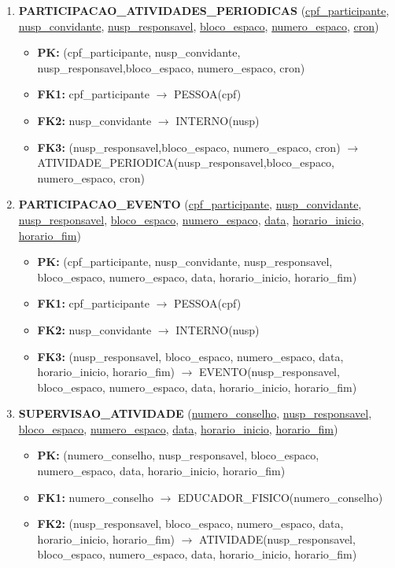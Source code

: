 \documentclass{article}
\begin{document}
\begin{enumerate}
    \item \textbf{PARTICIPACAO\_ATIVIDADES\_PERIODICAS} (\underline{cpf\_participante}, \underline{nusp\_convidante}, \underline{nusp\_responsavel}, \underline{bloco\_espaco}, \underline{numero\_espaco}, \underline{cron})
        \begin{itemize}
            \item \textbf{PK:} (cpf\_participante, nusp\_convidante, nusp\_responsavel,bloco\_espaco, numero\_espaco, cron)
            \item \textbf{FK1:} cpf\_participante $\rightarrow$ PESSOA(cpf)
            \item \textbf{FK2:} nusp\_convidante $\rightarrow$ INTERNO(nusp)
            \item \textbf{FK3:} (nusp\_responsavel,bloco\_espaco, numero\_espaco, cron) $\rightarrow$ ATIVIDADE\_PERIODICA(nusp\_responsavel,bloco\_espaco, numero\_espaco, cron)
        \end{itemize}

    \item \textbf{PARTICIPACAO\_EVENTO} (\underline{cpf\_participante}, \underline{nusp\_convidante}, \underline{nusp\_responsavel}, \underline{bloco\_espaco}, \underline{numero\_espaco}, \underline{data}, \underline{horario\_inicio}, \underline{horario\_fim})
        \begin{itemize}
            \item \textbf{PK:} (cpf\_participante, nusp\_convidante, nusp\_responsavel, bloco\_espaco, numero\_espaco, data, horario\_inicio, horario\_fim)
            \item \textbf{FK1:} cpf\_participante $\rightarrow$ PESSOA(cpf)
            \item \textbf{FK2:} nusp\_convidante $\rightarrow$ INTERNO(nusp)
            \item \textbf{FK3:} (nusp\_responsavel, bloco\_espaco, numero\_espaco, data, horario\_inicio, horario\_fim) $\rightarrow$ EVENTO(nusp\_responsavel, bloco\_espaco, numero\_espaco, data, horario\_inicio, horario\_fim)
        \end{itemize}
        
    \item \textbf{SUPERVISAO\_ATIVIDADE} (\underline{numero\_conselho}, \underline{nusp\_responsavel}, \underline{bloco\_espaco}, \underline{numero\_espaco}, \underline{data}, \underline{horario\_inicio}, \underline{horario\_fim})
        \begin{itemize}
            \item \textbf{PK:} (numero\_conselho, nusp\_responsavel, bloco\_espaco, numero\_espaco, data, horario\_inicio, horario\_fim)
            \item \textbf{FK1:} numero\_conselho $\rightarrow$ EDUCADOR\_FISICO(numero\_conselho)
            \item \textbf{FK2:} (nusp\_responsavel, bloco\_espaco, numero\_espaco, data, horario\_inicio, horario\_fim) $\rightarrow$ ATIVIDADE(nusp\_responsavel, bloco\_espaco, numero\_espaco, data, horario\_inicio, horario\_fim)
        \end{itemize}


\end{enumerate}
\end{document}

